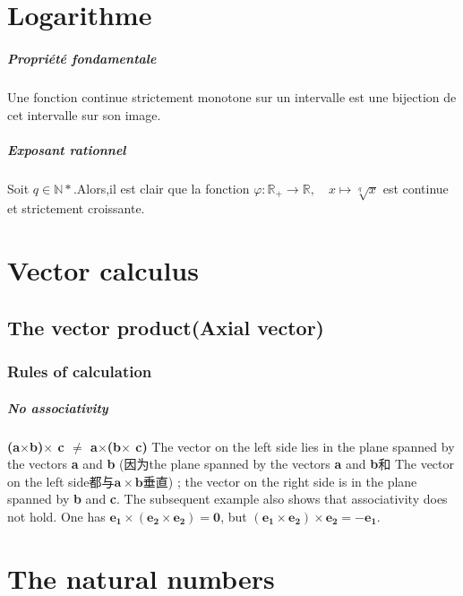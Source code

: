 \documentclass[12pt]{book}
\theoremstyle{definition}\newtheorem{dfn}{Définition}[chapter]
\theoremstyle{plain}\newtheorem{thm}{Théorème}[chapter]
\theoremstyle{plain}\newtheorem{prp}{Proposition}[chapter]
\theoremstyle{plain}\newtheorem{lem}{\bf Lemme}[chapter]
\theoremstyle{plain}\newtheorem{axm}{\bf Axiome}[chapter]
\theoremstyle{plain}\newtheorem{lmm}{\bf Lemme}[chapter]
\theoremstyle{plain}\newtheorem{exm}{\bf Example}[chapter]
\theoremstyle{plain}\newtheorem{cor}{\bf Corollaire}[chapter]
\theoremstyle{remark}\newtheorem{rem}{Remarque}[chapter]
\begin{document}
\chapter{Logarithme}
\paragraph{Propriété fondamentale} Une fonction continue strictement monotone sur un intervalle est une bijection de cet intervalle sur son image.


        \paragraph{Exposant rationnel}
        Soit $q\in \mathbb{N*}$.Alors,il est clair que la fonction $\varphi:\mathbb{R_+}\longrightarrow \mathbb{R},\quad x\longmapsto \sqrt[q]{x} $  est continue et strictement croissante.






        \chapter{Vector calculus}
        \section{The vector product(Axial vector)}
        \subsection{Rules of calculation}
        \paragraph{No associativity}
        \textbf{(a$\times$b)$\times$ c $\neq$ a$\times$(b$\times$ c)
        }     The vector on the left side lies in the plane spanned by the vectors \textbf{a} and \textbf{b} (因为the plane spanned by the vectors \textbf{a} and \textbf{b}和 The vector on the left side都与$\mathbf{a}\times\mathbf{b}$垂直) ; the vector on the right side is in the plane spanned by \textbf{b} and \textbf{c}. The subsequent example also shows that associativity does not hold. One has {$\mathbf{e_1}\times( \mathbf{e_2}\times \mathbf{e_2}) =\mathbf{0}$}, but {$(\mathbf{e_1}\times \mathbf{e_2})\times \mathbf{e_2} =\mathbf{-e_1}$}.






\chapter{The natural numbers}
\end{document}
